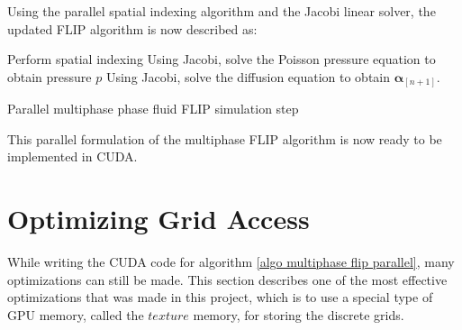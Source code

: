 Using the parallel spatial indexing algorithm and the Jacobi linear solver, the updated FLIP algorithm is now described as:


\gapM

\begin{algorithm}[H]
    \label{algo multiphase flip parallel}

    \SetAlgoLined
    Perform spatial indexing\;
    Using Jacobi, solve the Poisson pressure equation to obtain pressure $p$\;
    Using Jacobi, solve the diffusion equation to obtain $\bm{\alpha}_{[n+1]}$.

    \caption{Parallel multiphase phase fluid FLIP simulation step}

\end{algorithm}

\gapM

This parallel formulation of the multiphase FLIP algorithm is now ready to be implemented in CUDA.

\section{Optimizing Grid Access}
While writing the CUDA code for algorithm \ref{algo multiphase flip parallel}, many optimizations can still be made. This section describes one of the most effective optimizations that was made in this project, which is to use a special type of GPU memory, called the $texture$ memory, for storing the discrete grids.

